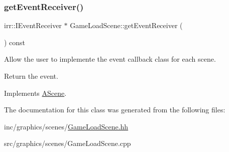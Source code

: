 \subsubsection{\texorpdfstring{get\+Event\+Receiver()}{getEventReceiver()}}
{\footnotesize\ttfamily irr\+::\+I\+Event\+Receiver $\ast$ Game\+Load\+Scene\+::get\+Event\+Receiver (\begin{DoxyParamCaption}{ }\end{DoxyParamCaption}) const\hspace{0.3cm}{\ttfamily [virtual]}}



Allow the user to implemente the event callback class for each scene. 

Return the event. 

Implements \hyperlink{classAScene_af521e5e6d30a5d2e5d30eb333e4d3abd}{A\+Scene}.



The documentation for this class was generated from the following files\+:\begin{DoxyCompactItemize}
\item 
inc/graphics/scenes/\hyperlink{GameLoadScene_8hh}{Game\+Load\+Scene.\+hh}\item 
src/graphics/scenes/Game\+Load\+Scene.\+cpp\end{DoxyCompactItemize}
